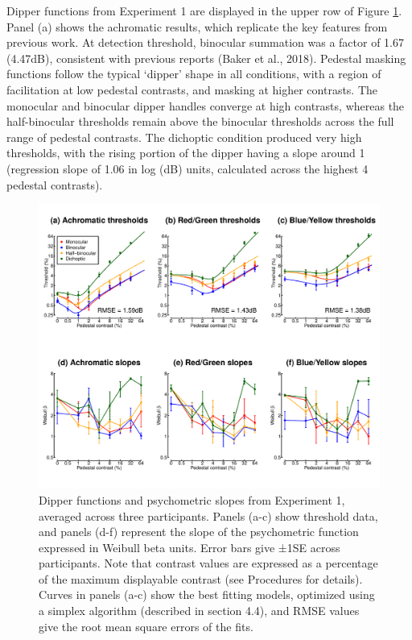 \documentclass[
]{article}
\begin{document}
Dipper functions from Experiment 1 are displayed in the upper row of Figure \ref{fig:dipperfig}. Panel (a) shows the achromatic results, which replicate the key features from previous work. At detection threshold, binocular summation was a factor of 1.67 (4.47dB), consistent with previous reports (Baker et al., 2018). Pedestal masking functions follow the typical `dipper' shape in all conditions, with a region of facilitation at low pedestal contrasts, and masking at higher contrasts. The monocular and binocular dipper handles converge at high contrasts, whereas the half-binocular thresholds remain above the binocular thresholds across the full range of pedestal contrasts. The dichoptic condition produced very high thresholds, with the rising portion of the dipper having a slope around 1 (regression slope of 1.06 in log (dB) units, calculated across the highest 4 pedestal contrasts).

\begin{figure}

{\centering \includegraphics{Figures/dipperssimplex} 

}

\caption{Dipper functions and psychometric slopes from Experiment 1, averaged across three participants. Panels (a-c) show threshold data, and panels (d-f) represent the slope of the psychometric function expressed in Weibull beta units. Error bars give ±1SE across participants. Note that contrast values are expressed as a percentage of the maximum displayable contrast (see Procedures for details). Curves in panels (a-c) show the best fitting models, optimized using a simplex algorithm (described in section 4.4), and RMSE values give the root mean square errors of the fits.}\label{fig:dipperfig}
\end{figure}
\end{document}
